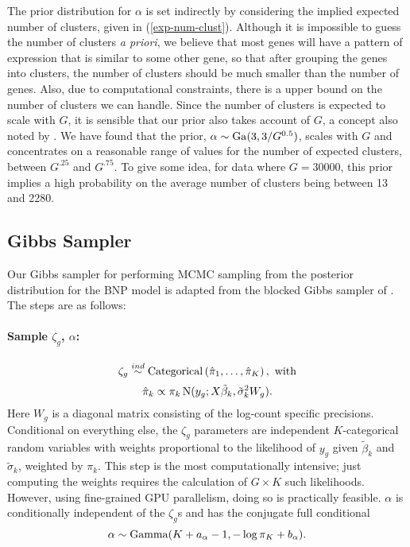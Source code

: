 \begin{itemize}
The prior distribution for $\alpha$ is set indirectly by considering the implied expected number of clusters, given in (\ref{exp-num-clust}). Although it is impossible to guess the number of clusters \textit{a priori}, we believe that most genes will have a pattern of expression that is similar to some other gene, so that after grouping the genes into clusters, the number of clusters should be much smaller than the number of genes. Also, due to computational constraints, there is a upper bound on the number of clusters we can handle. Since the number of clusters is expected to scale with $G$, it is sensible that our prior also takes account of $G$, a concept also noted by \citet{escobar1994}. We have found that the prior, $\alpha \sim \operatorname{Ga}(3,3/G^{0.5})$, scales with $G$ and concentrates on a reasonable range of values for the number of expected clusters, between $G^{.25}$ and $G^{.75}$. To give some idea, for data where $G=30000$, this prior implies a high probability on the average number of clusters being between 13 and 2280.


\subsection{Gibbs Sampler}
Our Gibbs sampler for performing MCMC sampling from the posterior distribution for the BNP model is adapted from the blocked Gibbs sampler of \citet{ishwaran2000}. The steps are as follows:

\paragraph{Sample $\zeta_g$, $\alpha$:}

\begin{equation*}
\zeta_g \stackrel{ind}{\sim} \operatorname{Categorical}\left(\hat{\pi}_1,\ldots,\hat{\pi}_K \right), \mbox{ with}
\end{equation*}
\begin{equation*}
\hat{\pi}_k \propto \pi_k \operatorname{N}(y_g;X\tilde{\beta}_k,\tilde{\sigma}_k^2 W_g).
\end{equation*}
Here $W_g$ is a diagonal matrix consisting of the log-count specific precisions. Conditional on everything else, the $\zeta_g$ parameters are independent $K$-categorical random variables with weights proportional to the likelihood of $y_g$ given $\tilde{\beta}_k$ and $\tilde{\sigma}_k$, weighted by $\pi_k$. This step is the most computationally intensive; just computing the weights requires the calculation of $G\times K$ such likelihoods. However, using fine-grained GPU parallelism, doing so is practically feasible. $\alpha$ is conditionally independent of the $\zeta_g$s and has the conjugate full conditional
\begin{equation*}
\alpha \sim \operatorname{Gamma}(K + a_\alpha - 1, -\log \pi_K + b_\alpha).
\end{equation*}



\end{itemize}
